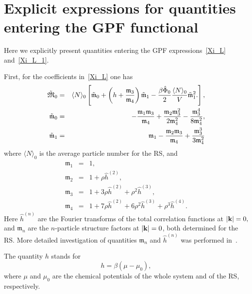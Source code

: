 \section{\label{sec:app-a} Explicit expressions for quantities entering the GPF functional}
Here we explicitly present quantities entering the GPF expressions~\eqref{Xi_L} and~\eqref{Xi_L_1}.

First, for the coefficients in~\eqref{Xi_L} one has
\begin{eqnarray*}
	\label{tilde_frak_M0}
	\tilde{\frak M}_0 & = & \langle N \rangle_0 
	\left[
		\tilde{\mathfrak{m}}_0
		+ \left(h + \frac{\mathfrak{m}_3}{\mathfrak{m}_4} \right) \tilde{\mathfrak{m}}_1
		- \frac{\beta \hat{\Phi}_0}{2}\frac{\langle N \rangle_0}{V} \tilde{\mathfrak{m}}_1^2.
	\right],
\\
	\tilde{\mathfrak{m}}_0 & = & -\frac{\mathfrak{m}_1 \mathfrak{m}_3}{\mathfrak{m}_4} + \frac{\mathfrak{m}_2 \mathfrak{m}^2_3}{2 \mathfrak{m}_4^2} - \frac{\mathfrak{m}_3^4}{8\mathfrak{m}_4^2},
\\
	\tilde{\mathfrak{m}}_1 & = & \mathfrak{m}_1 - \frac{\mathfrak{m}_2 \mathfrak{m}_3}{\mathfrak{m}_4} + \frac{\mathfrak{m}_3^3}{3\mathfrak{m}_4^2}
\end{eqnarray*}
where $\langle N \rangle_0$ is the average particle number for the RS, and
\begin{eqnarray*}
	\mathfrak{m}_1 & = & 1,
	\\
	\mathfrak{m}_2 & = & 1 + \rho \hat{h}^{(2)},
	\\
	\mathfrak{m}_3 & = & 1 + 3\rho \hat{h}^{(2)} + \rho^2 \hat{h}^{(3)},
	\\
	\mathfrak{m}_4 & = & 1 + 7\rho \hat{h}^{(2)} + 6\rho^2 \hat{h}^{(3)} + \rho^3 \hat{h}^{(4)}.
\end{eqnarray*}
Here $\hat{h}^{(n)}$ are the Fourier transforms of the total correlation functions at $\abs{\vb k} = 0,$ and $\mathfrak{m}_n$ are the $n$-particle structure factors at $\abs{\vb k} = 0$, both determined for the RS. More detailed investigation of quantities $\mathfrak{m}_n$ and $\hat{h}^{(n)}$ was performed in~\cite{RomaJPS2024,Roma2023Preprint}.

The quantity $h$ stands for
\begin{equation*}
	h = \beta(\mu - \mu_0),
\end{equation*}
where $\mu$ and $\mu_0$ are the chemical potentials of the whole system and of the RS, respectively.

